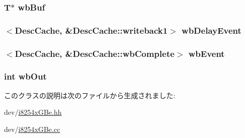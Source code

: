 \label{classIGbE_1_1DescCache_aeb55673ae3c17ae211ad114c823bf761}
\hypertarget{classIGbE_1_1DescCache_a48d72919f0a5e868ed72f1b9f995e294}{
\subsubsection[{wbBuf}]{\setlength{\rightskip}{0pt plus 5cm}T$\ast$ {\bf wbBuf}}}
\label{classIGbE_1_1DescCache_a48d72919f0a5e868ed72f1b9f995e294}
\hypertarget{classIGbE_1_1DescCache_a20fa57c5779fd6371598e36d8ba9a5aa}{
\subsubsection[{wbDelayEvent}]{$<${\bf DescCache}, \&DescCache::writeback1$>$ {\bf wbDelayEvent}}}
\label{classIGbE_1_1DescCache_a20fa57c5779fd6371598e36d8ba9a5aa}
\hypertarget{classIGbE_1_1DescCache_ae9ac7c384feda84fd885f523f0ce5f73}{
\subsubsection[{wbEvent}]{$<${\bf DescCache}, \&DescCache::wbComplete$>$ {\bf wbEvent}}}
\label{classIGbE_1_1DescCache_ae9ac7c384feda84fd885f523f0ce5f73}
\hypertarget{classIGbE_1_1DescCache_a40ac490f16b3b0f977f34621d2b8c550}{
\subsubsection[{wbOut}]{\setlength{\rightskip}{0pt plus 5cm}int {\bf wbOut}}}
\label{classIGbE_1_1DescCache_a40ac490f16b3b0f977f34621d2b8c550}


このクラスの説明は次のファイルから生成されました:\begin{DoxyCompactItemize}
\item 
dev/\hyperlink{i8254xGBe_8hh}{i8254xGBe.hh}\item 
dev/\hyperlink{i8254xGBe_8cc}{i8254xGBe.cc}\end{DoxyCompactItemize}
